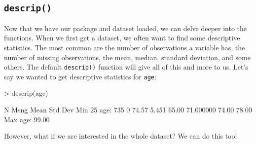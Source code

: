 \documentclass{article}
\begin{document}
\subsection{\texttt{descrip()}}
Now that we have our package and dataset loaded, we can delve deeper into the functions. When we first get a dataset, we often want to find some descriptive statistics. The most common are the number of observations a variable has, the number of missing observations, the mean, median, standard deviation, and some others. The default \texttt{descrip()} function will give all of this and more to us. Let's say we wanted to get descriptive statistics for \texttt{age}:
\begin{Schunk}
\begin{Sinput}
> descrip(age)
\end{Sinput}
\begin{Soutput}
       N     Msng  Mean      Std Dev    Min       25%
age:     735     0   74.57     5.451     65.00    71.000000   74.00     78.00  
        Max     
age:     99.00  
\end{Soutput}
\end{Schunk}
However, what if we are interested in the whole dataset? We can do this too!
\end{document}
